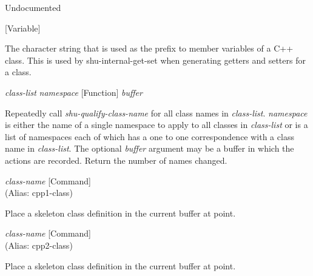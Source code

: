 \begin{doc-string}
Undocumented
\end{doc-string}

\vspace{1em}
\noindent
{}
\usebox{\funcname}
 \hfill [Variable]

\begin{doc-string}
The character string that is used as the prefix to member variables of a C++ class.
This is used by shu-internal-get-set when generating getters and setters for a class.
\end{doc-string}

\vspace{1em}
\noindent
{}
\usebox{\funcname}\emph{class-list} \emph{namespace}
 \hfill [Function]
\hspace*{\wd\funcname}\emph{buffer}

\begin{doc-string}
Repeatedly call \emph{shu-qualify-class-name} for all class names in \emph{class-list}.
\emph{namespace} is either the name of a single namespace to apply to all classes
in \emph{class-list} or is a list of namespaces each of which has a one to one
correspondence with a class name in \emph{class-list}.  The optional \emph{buffer}
argument may be a buffer in which the actions are recorded.  Return the
number of names changed.
\end{doc-string}

\vspace{1em}
\noindent
{}
\usebox{\funcname}\emph{class-name}
 \hfill [Command]\\%
 (Alias: cpp1-class)

\begin{doc-string}
Place a skeleton class definition in the current buffer at point.
\end{doc-string}

\vspace{1em}
\noindent
{}
\usebox{\funcname}\emph{class-name}
 \hfill [Command]\\%
 (Alias: cpp2-class)

\begin{doc-string}
Place a skeleton class definition in the current buffer at point.
\end{doc-string}

